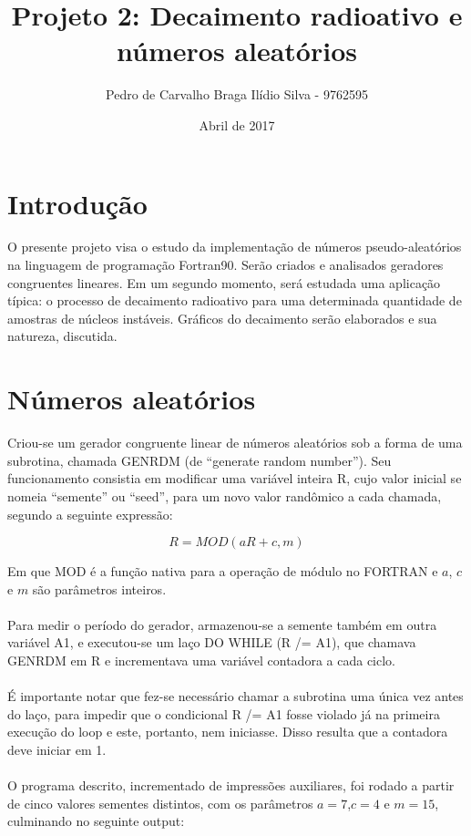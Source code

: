 \documentclass{article}
\title{Projeto 2: Decaimento radioativo e números aleatórios}
\author{Pedro de Carvalho Braga Ilídio Silva - 9762595}
\date{Abril de 2017}
\begin{document}
\maketitle

\section{Introdução}

O presente projeto visa o estudo da implementação de números pseudo-aleatórios na linguagem de programação Fortran90. Serão criados e analisados geradores congruentes lineares. Em um segundo momento, será estudada uma aplicação típica: o processo de decaimento radioativo para uma determinada quantidade de amostras de núcleos instáveis. Gráficos do decaimento serão elaborados e sua natureza, discutida.

\section{Números aleatórios}

Criou-se um gerador congruente linear de números aleatórios sob a forma de uma subrotina, chamada GENRDM (de ``generate random number''). Seu funcionamento consistia em modificar uma variável inteira R, cujo valor inicial se nomeia ``semente'' ou ``seed'', para um novo valor randômico a cada chamada, segundo a seguinte expressão:


\begin{displaymath}
  \label{eq:gerador}
  R=MOD(aR+c, m)
\end{displaymath}

Em que MOD é a função nativa para a operação de módulo no FORTRAN e \(a\), \(c\) e \(m\) são parâmetros inteiros. \paragraph{}
Para medir o período do gerador, armazenou-se a semente também em outra variável A1, e executou-se um laço DO WHILE (R /= A1), que chamava GENRDM em R e incrementava uma variável contadora a cada ciclo.\paragraph{}
É importante notar que fez-se necessário chamar a subrotina uma única vez antes do laço, para impedir que o condicional R /= A1 fosse violado já na primeira execução do loop e este, portanto, nem iniciasse. Disso resulta que a contadora deve iniciar em 1.\paragraph{}
O programa descrito, incrementado de impressões auxiliares, foi rodado a partir de cinco valores sementes distintos, com os parâmetros \(a=7\),\(c=4\) e \(m = 15\), culminando no seguinte output:
\end{document}
